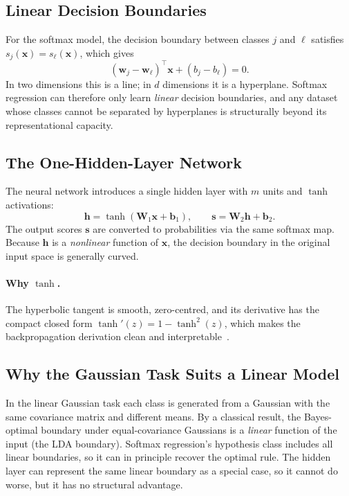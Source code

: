 \documentclass[11pt]{article}
\newcommand{\bw}{\mathbf{w}}   %
\newcommand{\W}{\mathbf{W}}
\newcommand{\bx}{\mathbf{x}}
\newcommand{\bb}{\mathbf{b}}
\newcommand{\bh}{\mathbf{h}}
\newcommand{\bs}{\mathbf{s}}
\begin{document}
\subsection{Linear Decision Boundaries}
\label{subsec:linear_boundary}

For the softmax model, the decision boundary between classes $j$ and $\ell$
satisfies $s_j(\bx)=s_\ell(\bx)$, which gives
\[
  (\bw_j-\bw_\ell)^{\top}\bx+(b_j-b_\ell)=0.
\]
In two dimensions this is a line; in $d$ dimensions it is a hyperplane.
Softmax regression can therefore only learn \emph{linear} decision boundaries,
and any dataset whose classes cannot be separated by hyperplanes is structurally
beyond its representational capacity.

\subsection{The One-Hidden-Layer Network}
\label{subsec:nn_bg}

The neural network introduces a single hidden layer with $m$ units and $\tanh$
activations:
\[
  \bh=\tanh(\W_1\bx+\bb_1),\qquad\bs=\W_2\bh+\bb_2.
\]
The output scores $\bs$ are converted to probabilities via the same softmax map.
Because $\bh$ is a \emph{nonlinear} function of $\bx$, the decision boundary in
the original input space is generally curved.

\paragraph{Why $\tanh$.}
The hyperbolic tangent is smooth, zero-centred, and its derivative has the
compact closed form $\tanh'(z)=1-\tanh^2(z)$, which makes the
backpropagation derivation clean and interpretable~\cite{goodfellow2016}.

\subsection{Why the Gaussian Task Suits a Linear Model}
\label{subsec:gaussian_geometry}

In the linear Gaussian task each class is generated from a Gaussian with the
same covariance matrix and different means.
By a classical result, the Bayes-optimal boundary under equal-covariance
Gaussians is a \emph{linear} function of the input (the LDA boundary).
Softmax regression's hypothesis class includes all linear boundaries, so it can
in principle recover the optimal rule.
The hidden layer can represent the same linear boundary as a special case, so
it cannot do worse, but it has no structural advantage.
\end{document}
